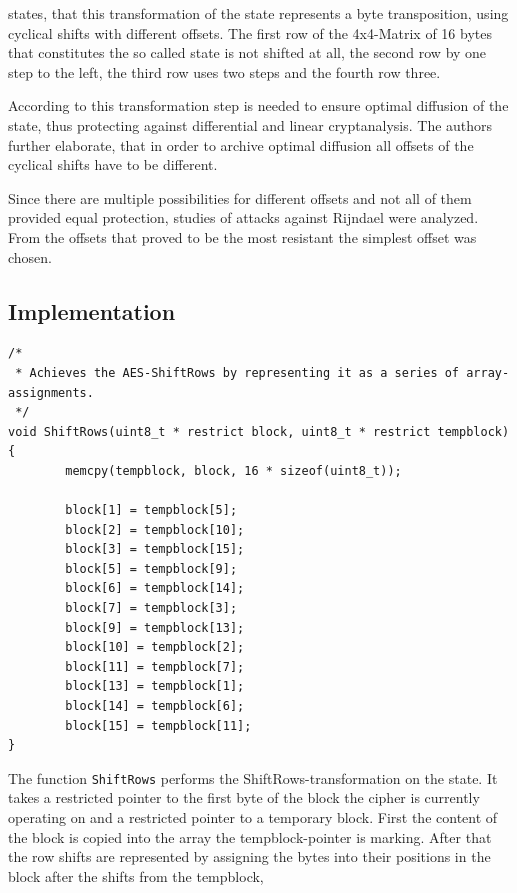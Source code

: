 \cite[p. 37]{rijndael} states, that this transformation of the state represents a byte transposition, using
cyclical shifts with different offsets. The first row of the 4x4-Matrix
of 16 bytes that constitutes the so called state is not shifted at all,
the second row by one step to the left, the third row uses two steps and
the fourth row three.

According to \cite{rijndael} this transformation step is needed to ensure
optimal diffusion of the state, thus protecting
against differential and linear cryptanalysis. The authors further
elaborate, that in order to archive optimal diffusion all
offsets of the cyclical shifts have to be different.

Since there are multiple possibilities for different offsets and not all
of them provided equal protection, studies of attacks against Rijndael
were analyzed. From the offsets that proved to be the most resistant the
simplest offset was chosen.

\hypertarget{implementation-3}{%
\subsection{Implementation}\label{implementation-3}}

\begin{lstlisting}
/*
 * Achieves the AES-ShiftRows by representing it as a series of array-assignments.
 */
void ShiftRows(uint8_t * restrict block, uint8_t * restrict tempblock)
{
        memcpy(tempblock, block, 16 * sizeof(uint8_t));

        block[1] = tempblock[5];
        block[2] = tempblock[10];
        block[3] = tempblock[15];
        block[5] = tempblock[9];
        block[6] = tempblock[14];
        block[7] = tempblock[3];
        block[9] = tempblock[13];
        block[10] = tempblock[2];
        block[11] = tempblock[7];
        block[13] = tempblock[1];
        block[14] = tempblock[6];
        block[15] = tempblock[11];
}
\end{lstlisting}

The function \lstinline|ShiftRows| performs the ShiftRows-transformation on the
state. It takes a restricted pointer to the first byte of the block the
cipher is currently operating on and a restricted pointer to a temporary
block. First the content of the block is copied into the array the
tempblock-pointer is marking. After that the row shifts are represented
by assigning the bytes into their positions in the block after the
shifts from the tempblock,

